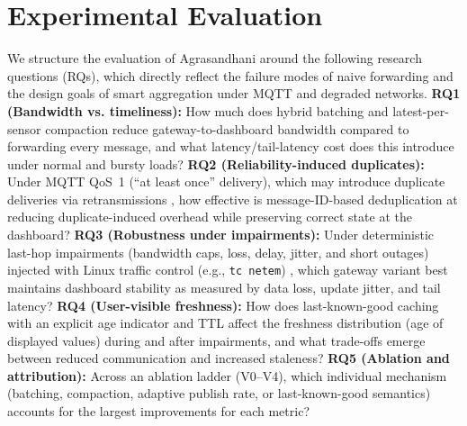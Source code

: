 \section{Experimental Evaluation}

We structure the evaluation of Agrasandhani around the following research questions (RQs), which directly reflect the failure modes of naive forwarding and the design goals of smart aggregation under MQTT and degraded networks. \textbf{RQ1 (Bandwidth vs. timeliness):} How much does hybrid batching and latest-per-sensor compaction reduce gateway-to-dashboard bandwidth compared to forwarding every message, and what latency/tail-latency cost does this introduce under normal and bursty loads? \textbf{RQ2 (Reliability-induced duplicates):} Under MQTT QoS~1 (``at least once'' delivery), which may introduce duplicate deliveries via retransmissions \cite{mqtt311}, how effective is message-ID-based deduplication at reducing duplicate-induced overhead while preserving correct state at the dashboard? \textbf{RQ3 (Robustness under impairments):} Under deterministic last-hop impairments (bandwidth caps, loss, delay, jitter, and short outages) injected with Linux traffic control (e.g., \texttt{tc netem}) \cite{jurgelionis2011_netem_empirical}, which gateway variant best maintains dashboard stability as measured by data loss, update jitter, and tail latency? \textbf{RQ4 (User-visible freshness):} How does last-known-good caching with an explicit age indicator and TTL affect the freshness distribution (age of displayed values) during and after impairments, and what trade-offs emerge between reduced communication and increased staleness? \textbf{RQ5 (Ablation and attribution):} Across an ablation ladder (V0--V4), which individual mechanism (batching, compaction, adaptive publish rate, or last-known-good semantics) accounts for the largest improvements for each metric?

